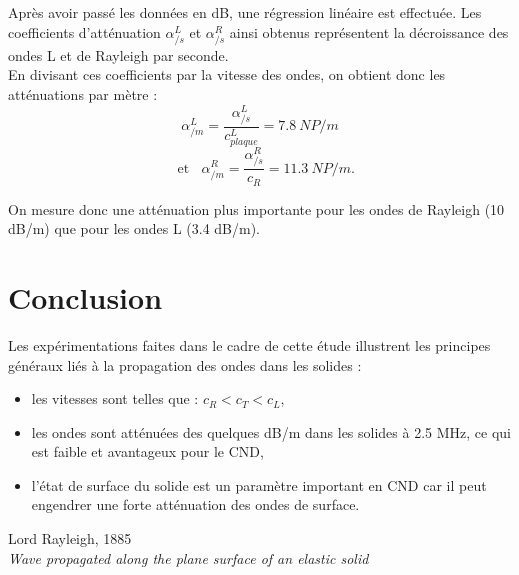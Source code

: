 \documentclass[twoside]{article}
\begin{document}
\begin{multicols}{2}
Après avoir passé les données en dB, une régression linéaire est effectuée. Les coefficients d'atténuation $\alpha_{/s}^{L}$ et $\alpha_{/s}^{R}$ ainsi obtenus représentent la décroissance des ondes L et de Rayleigh par seconde. \\
En divisant ces coefficients par la vitesse des ondes, on obtient donc les atténuations par mètre : 
$$\alpha_{/m}^{L}=\frac{\alpha_{/s}^L}{c_{plaque}^L}=7.8 ~NP/m$$ $$~~~~\text{et}~~~~\alpha_{/m}^{R}=\frac{\alpha_{/s}^R}{c_{R}}=11.3~NP/m.$$

On mesure donc une atténuation plus importante pour les ondes de Rayleigh (10 dB/m) que pour les ondes L (3.4 dB/m).

\section{Conclusion}

Les expérimentations faites dans le cadre de cette étude illustrent les principes généraux liés à la propagation des ondes dans  les solides : 
\begin{itemize}
	\item les vitesses sont telles que : $c_{R}<c_{T}<c_{L}$,
	\item les ondes sont atténuées des quelques dB/m dans les solides à 2.5 MHz, ce qui est faible et avantageux pour le CND,
	\item l'état de surface du solide est un paramètre important en CND car il peut engendrer une forte atténuation des ondes de surface.	
\end{itemize}

\begin{thebibliography}{99} %
Lord Rayleigh, 1885 \\
\newblock \emph{ Wave propagated along the plane surface of an elastic solid}
\end{thebibliography}

\end{multicols}
\end{document}
